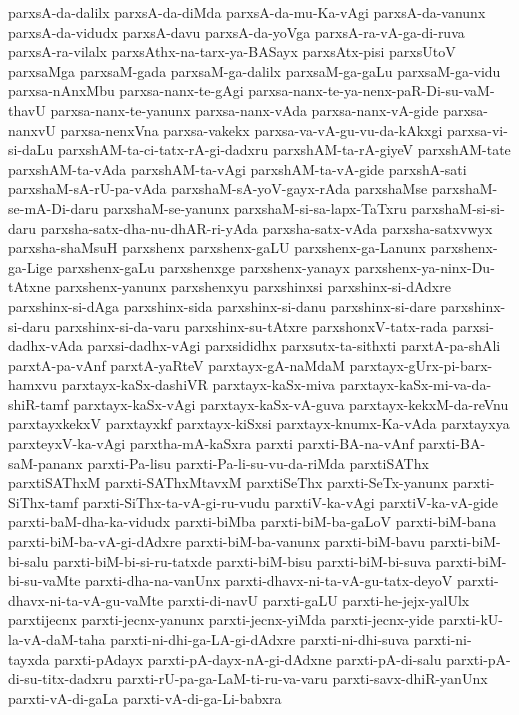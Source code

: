 {parxsA-da-dalilx
parxsA-da-diMda
parxsA-da-mu-Ka-vAgi
parxsA-da-vanunx
parxsA-da-vidudx
parxsA-davu
parxsA-da-yoVga
parxsA-ra-vA-ga-di-ruva
parxsA-ra-vilalx
parxsAthx-na-tarx-ya-BASayx
parxsAtx-pisi
parxsUtoV
parxsaMga
parxsaM-gada
parxsaM-ga-dalilx
parxsaM-ga-gaLu
parxsaM-ga-vidu
parxsa-nAnxMbu
parxsa-nanx-te-gAgi
parxsa-nanx-te-ya-nenx-paR-Di-su-vaM-thavU
parxsa-nanx-te-yanunx
parxsa-nanx-vAda
parxsa-nanx-vA-gide
parxsa-nanxvU
parxsa-nenxVna
parxsa-vakekx
parxsa-va-vA-gu-vu-da-kAkxgi
parxsa-vi-si-daLu
parxshAM-ta-ci-tatx-rA-gi-dadxru
parxshAM-ta-rA-giyeV
parxshAM-tate
parxshAM-ta-vAda
parxshAM-ta-vAgi
parxshAM-ta-vA-gide
parxshA-sati
parxshaM-sA-rU-pa-vAda
parxshaM-sA-yoV-gayx-rAda
parxshaMse
parxshaM-se-mA-Di-daru
parxshaM-se-yanunx
parxshaM-si-sa-lapx-TaTxru
parxshaM-si-si-daru
parxsha-satx-dha-nu-dhAR-ri-yAda
parxsha-satx-vAda
parxsha-satxvwyx
parxsha-shaMsuH
parxshenx
parxshenx-gaLU
parxshenx-ga-Lanunx
parxshenx-ga-Lige
parxshenx-gaLu
parxshenxge
parxshenx-yanayx
parxshenx-ya-ninx-Du-tAtxne
parxshenx-yanunx
parxshenxyu
parxshinxsi
parxshinx-si-dAdxre
parxshinx-si-dAga
parxshinx-sida
parxshinx-si-danu
parxshinx-si-dare
parxshinx-si-daru
parxshinx-si-da-varu
parxshinx-su-tAtxre
parxshonxV-tatx-rada
parxsi-dadhx-vAda
parxsi-dadhx-vAgi
parxsididhx
parxsutx-ta-sithxti
parxtA-pa-shAli
parxtA-pa-vAnf
parxtA-yaRteV
parxtayx-gA-naMdaM
parxtayx-gUrx-pi-barx-hamxvu
parxtayx-kaSx-dashiVR
parxtayx-kaSx-miva
parxtayx-kaSx-mi-va-da-shiR-tamf
parxtayx-kaSx-vAgi
parxtayx-kaSx-vA-guva
parxtayx-kekxM-da-reVnu
parxtayxkekxV
parxtayxkf
parxtayx-kiSxsi
parxtayx-knumx-Ka-vAda
parxtayxya
parxteyxV-ka-vAgi
parxtha-mA-kaSxra
parxti
parxti-BA-na-vAnf
parxti-BA-saM-pananx
parxti-Pa-lisu
parxti-Pa-li-su-vu-da-riMda
parxtiSAThx
parxtiSAThxM
parxti-SAThxMtavxM
parxtiSeThx
parxti-SeTx-yanunx
parxti-SiThx-tamf
parxti-SiThx-ta-vA-gi-ru-vudu
parxtiV-ka-vAgi
parxtiV-ka-vA-gide
parxti-baM-dha-ka-vidudx
parxti-biMba
parxti-biM-ba-gaLoV
parxti-biM-bana
parxti-biM-ba-vA-gi-dAdxre
parxti-biM-ba-vanunx
parxti-biM-bavu
parxti-biM-bi-salu
parxti-biM-bi-si-ru-tatxde
parxti-biM-bisu
parxti-biM-bi-suva
parxti-biM-bi-su-vaMte
parxti-dha-na-vanUnx
parxti-dhavx-ni-ta-vA-gu-tatx-deyoV
parxti-dhavx-ni-ta-vA-gu-vaMte
parxti-di-navU
parxti-gaLU
parxti-he-jejx-yalUlx
parxtijecnx
parxti-jecnx-yanunx
parxti-jecnx-yiMda
parxti-jecnx-yide
parxti-kU-la-vA-daM-taha
parxti-ni-dhi-ga-LA-gi-dAdxre
parxti-ni-dhi-suva
parxti-ni-tayxda
parxti-pAdayx
parxti-pA-dayx-nA-gi-dAdxne
parxti-pA-di-salu
parxti-pA-di-su-titx-dadxru
parxti-rU-pa-ga-LaM-ti-ru-va-varu
parxti-savx-dhiR-yanUnx
parxti-vA-di-gaLa
parxti-vA-di-ga-Li-babxra
}
